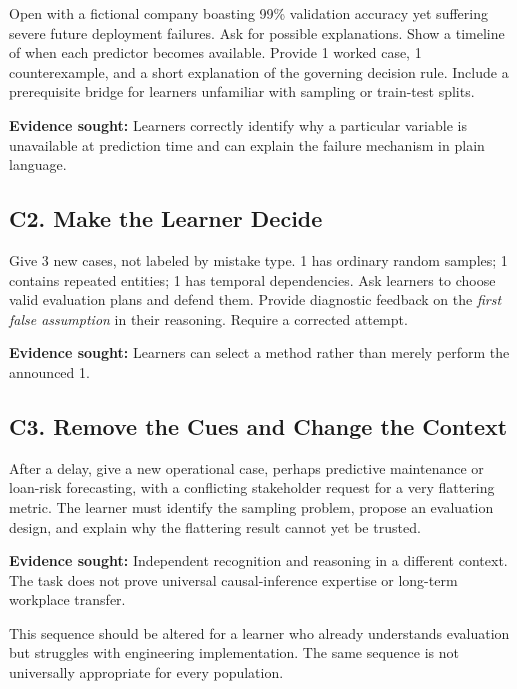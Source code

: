 Open with a fictional company boasting 99\% validation accuracy yet suffering severe future deployment failures. Ask for possible explanations. Show a timeline of when each predictor becomes available. Provide 1 worked case, 1 counterexample, and a short explanation of the governing decision rule. Include a prerequisite bridge for learners unfamiliar with sampling or train-test splits.

\textbf{Evidence sought:} Learners correctly identify why a particular variable is unavailable at prediction time and can explain the failure mechanism in plain language.

\subsection*{C2. Make the Learner Decide}

Give 3 new cases, not labeled by mistake type. 1 has ordinary random samples; 1 contains repeated entities; 1 has temporal dependencies. Ask learners to choose valid evaluation plans and defend them. Provide diagnostic feedback on the \emph{first false assumption} in their reasoning. Require a corrected attempt.

\textbf{Evidence sought:} Learners can select a method rather than merely perform the announced 1.

\subsection*{C3. Remove the Cues and Change the Context}

After a delay, give a new operational case, perhaps predictive maintenance or loan-risk forecasting, with a conflicting stakeholder request for a very flattering metric. The learner must identify the sampling problem, propose an evaluation design, and explain why the flattering result cannot yet be trusted.

\textbf{Evidence sought:} Independent recognition and reasoning in a different context. The task does not prove universal causal-inference expertise or long-term workplace transfer.

This sequence should be altered for a learner who already understands evaluation but struggles with engineering implementation. The same sequence is not universally appropriate for every population.
